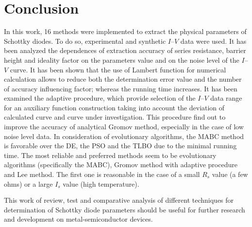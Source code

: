 \documentclass[aip,jap,reprint]{revtex4-1}
\begin{document}
\section{Conclusion}
In this work, 16 methods were implemented to extract the physical parameters of Schottky diodes.
To do so, experimental and synthetic $I$--$V$ data were used.
It has been analyzed the dependences of extraction accuracy of series resistance, barrier height and ideality factor on the parameters value and on the noise level of the $I$--$V$ curve.
It has been shown that the use of Lambert function for numerical calculation allows to reduce both the determination error value and the number of accuracy influencing factor; whereas the running time increases.
It has been examined the adaptive procedure, which provide selection of the $I$--$V$ data range for an auxiliary function construction taking into account the deviation of calculated curve and curve under investigation.
This procedure find out to improve the accuracy of analytical Gromov method, especially in the case of low noise level data.
In consideration of evolutionary algorithms, the MABC method is favorable over the DE, the PSO and the TLBO due to the minimal running time.
The most reliable and preferred methods seem to be evolutionary algorithms (specifically the MABC), Gromov method with adaptive procedure and Lee method.
The first one is reasonable in the case of
a small $R_s$ value (a few ohms) or a large $I_s$ value (high temperature).

This work of review, test and comparative analysis of different techniques for determination of Schottky diode parameters should be useful for further research and development on metal-semiconductor devices.


\end{document}
